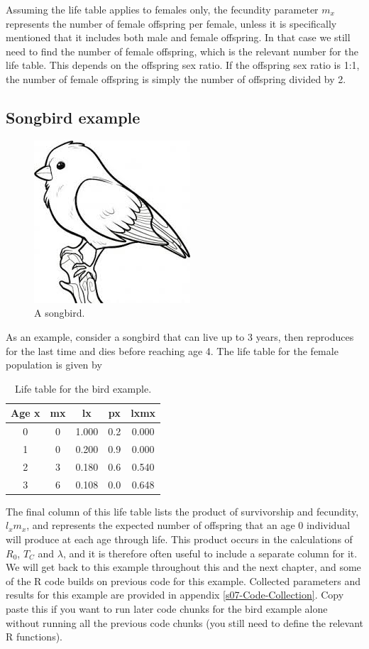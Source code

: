 \documentclass[
]{book}
\begin{document}
Assuming the life table applies to females only, the fecundity parameter \(m_x\) represents the number of female offspring per female, unless it is specifically mentioned that it includes both male and female offspring. In that case we still need to find the number of female offspring, which is the relevant number for the life table. This depends on the offspring sex ratio. If the offspring sex ratio is 1:1, the number of female offspring is simply the number of offspring divided by 2.

\hypertarget{bird}{%
\subsection{Songbird example}\label{bird}}

\begin{figure}
\includegraphics[width=0.3\linewidth]{Songbird2} \caption{A songbird.}\label{fig:fig2}
\end{figure}

As an example, consider a songbird that can live up to 3 years, then reproduces for the last time and dies before reaching age 4. The life table for the female population is given by

\begin{table}

\caption{\label{tab:tablebird}Life table for the bird example.}
\centering
\begin{tabular}[t]{ccccc}
\toprule
Age x & mx & lx & px & lxmx\\
\midrule
0 & 0 & 1.000 & 0.2 & 0.000\\
1 & 0 & 0.200 & 0.9 & 0.000\\
2 & 3 & 0.180 & 0.6 & 0.540\\
3 & 6 & 0.108 & 0.0 & 0.648\\
\bottomrule
\end{tabular}
\end{table}

The final column of this life table lists the product of survivorship and fecundity, \(l_xm_x\), and represents the expected number of offspring that an age 0 individual will produce at each age through life. This product occurs in the calculations of \(R_0\), \(T_C\) and \(\lambda\), and it is therefore often useful to include a separate column for it. We will get back to this example throughout this and the next chapter, and some of the R code builds on previous code for this example. Collected parameters and results for this example are provided in appendix \ref{s07-Code-Collection}. Copy paste this if you want to run later code chunks for the bird example alone without running all the previous code chunks (you still need to define the relevant R functions).
\end{document}

